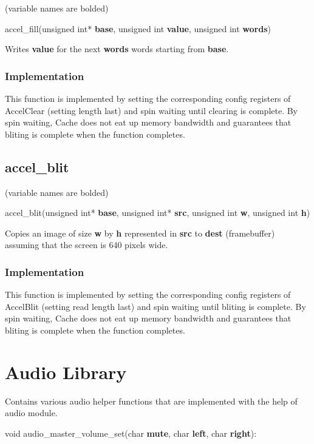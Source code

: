 \documentclass[10pt]{report}
\begin{document}
(variable names are bolded)

accel\_fill(unsigned int* \textbf{base}, unsigned int \textbf{value}, unsigned int \textbf{words})

Writes \textbf{value} for the next \textbf{words} words starting from \textbf{base}.

\subsubsection{Implementation}

This function is implemented by setting the corresponding config registers of AccelClear (setting length last) and spin waiting until clearing is complete. By spin waiting, Cache does not eat up memory bandwidth and guarantees that bliting is complete when the function completes.

\subsection{accel\_blit}

(variable names are bolded)

accel\_blit(unsigned int* \textbf{base}, unsigned int* \textbf{src}, unsigned int \textbf{w},
            unsigned int \textbf{h})

Copies an image of size \textbf{w} by \textbf{h} represented in \textbf{src} to \textbf{dest} 
(framebuffer) assuming that the screen is 640 pixels wide.

\subsubsection{Implementation}

This function is implemented by setting the corresponding config registers of AccelBlit (setting read length last) and spin waiting until bliting is complete. By spin waiting, Cache does not eat up memory bandwidth and guarantees that bliting is complete when the function completes. 

\section{Audio Library}

Contains various audio helper functions that are implemented with the help of audio module.

void audio\_master\_volume\_set(char \textbf{mute}, char \textbf{left}, char \textbf{right}):
\end{document}

